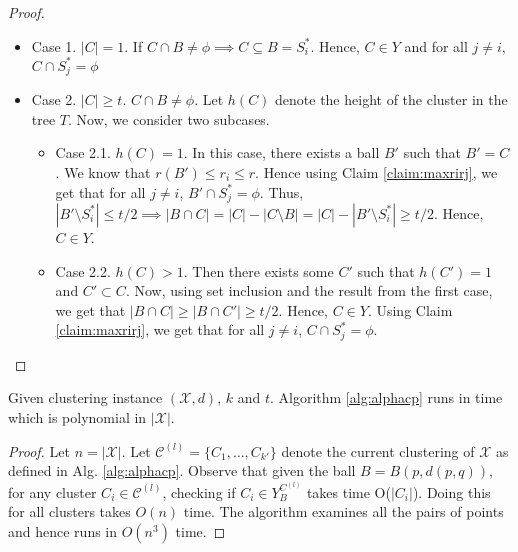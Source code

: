 \documentclass[11pt]{article}
\newcommand{\mc}{\mathcal}
\begin{document}
\begin{proof}
\begin{itemize}[nolistsep]
\item Case 1. $|C| = 1$. If $C \cap B \neq \phi \implies C \subseteq B = S_i^*$. Hence, $C \in Y$ and for all $j \neq i$, $C \cap S_j^* = \phi$

\item Case 2. $|C|\ge t$. $C \cap B \neq \phi$. Let $h(C)$ denote the height of the cluster in the tree $T$. Now, we consider two subcases.
\begin{itemize}
\renewcommand\labelitemii{$\circ$}
\item Case 2.1. $h(C) = 1$. In this case, there exists a ball $B'$ such that $B' = C$. We know that $r(B') \le r_i \le r$. Hence using Claim \ref{claim:maxrirj}, we get that for all $j \neq i$, $B' \cap S_j^* = \phi$. Thus, $|B'\setminus S_i^*| \le t/2 \implies |B\cap C| = |C| - |C\setminus B| = |C| - |B'\setminus S_i^*| \ge t/2$. Hence, $C \in Y$.

\item Case 2.2. $h(C) > 1$. Then there exists some $C'$ such that $h(C') = 1$ and $C' \subset C$. Now, using set inclusion and the result from the first case, we get that $|B\cap C| \ge |B\cap C'| \ge t/2$. Hence, $C \in Y$. Using Claim \ref{claim:maxrirj}, we get that for all $j \neq i$, $C \cap S_j^* = \phi$.
\end{itemize} 
\end{itemize}
\end{proof}

\begin{theorem}
Given clustering instance $(\mc X, d)$, $k$ and $t$. Algorithm \ref{alg:alphacp} runs in time which is polynomial in $|\mc X|$.
\end{theorem}

\begin{proof}
Let $n = |\mc X|$. Let $\mc C^{(l)} =\{C_1, \ldots, C_{k'}\}$ denote the current clustering of $\mc X$ as defined in Alg. \ref{alg:alphacp}. Observe that given the ball $B = B(p, d(p, q))$, for any cluster $C_i \in \mc C^{(l)}$, checking if $C_i \in Y_B^{C^{(l)}}$ takes time O($|C_i|$). Doing this for all clusters takes $O(n)$ time. The algorithm examines all the pairs of points and hence runs in $O(n^3)$ time.
\end{proof}
\end{document}
